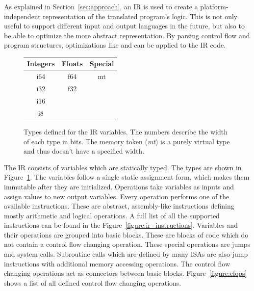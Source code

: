 \documentclass[course=eragp]{aspdoc}
\begin{document}
As explained in Section~\ref{sec:approach}, an IR is used to create a platform-independent
representation of the translated program's logic. This is not only useful to support different input
and output languages in the future, but also to be able to optimize the more abstract representation.
By parsing control flow and program structures, optimizations like
 and  can be applied to the IR code.

\begin{figure}[H]
    \begin{center}
        \begin{tabular}{|c | c | c|}
            \hline
            Integers & Floats & Special \\ [0.5ex]
            \hline\hline
            i64      & f64    & mt      \\
            \hline
            i32      & f32    &         \\
            \hline
            i16      &        &         \\
            \hline
            i8       &        &         \\
            \hline
        \end{tabular}
        \caption{Types defined for the IR variables. The numbers describe the width of each type in bits. The
            memory token (\textit{mt}) is a purely virtual type and thus doesn't have a specified width.}\label{ir:types:figure}
    \end{center}
\end{figure}


The IR consists of variables which are statically typed. The types are shown in
Figure~\ref{ir:types:figure}. The variables follow a single static assignment form, which makes them
immutable after they are initialized. Operations take variables as inputs and assign values to
new output variables. Every operation performs one of the available instructions. These are abstract,
assembly-like instructions defining mostly arithmetic and logical operations. A full list of all the
supported instructions can be found in the Figure~\ref{figure:ir_instructions}.
Variables and their operations are grouped into basic blocks. These are blocks of code
which do not contain a control flow changing operation. These special operations are jumps and
system calls. Subroutine calls which are defined by many ISAs are also jump instructions with
additional memory accessing operations. The control flow changing operations act as connectors
between basic blocks. Figure~\ref{figure:cfops} shows a list of all defined control flow changing operations.
\end{document}
